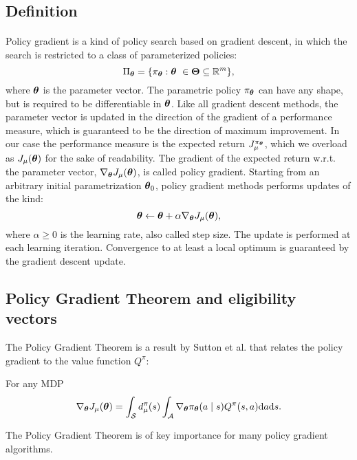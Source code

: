 \subsection{Definition}
\paragraph{} %
Policy gradient is a kind of policy search based on gradient descent, in which the search is restricted to a class of parameterized policies:  
\[
	\Pi_{\vtheta} = \{\pi_{\vtheta}:\vtheta\ \in \vTheta \subseteq \mathbb{R}^m\},
\]
where $\boldsymbol{\theta}$ is the parameter vector. The parametric policy $\pi_{\boldsymbol{\theta}}$ can have any shape, but is required to be differentiable in $\boldsymbol{\theta}$. Like all gradient descent methods, the parameter vector is updated in the direction of the gradient of a performance measure, which is guaranteed to be the direction of maximum improvement. In our case the performance measure is the expected return $J_{\mu}^{\pi_{\boldsymbol{\theta}}}$, which we overload as $J_{\mu}(\boldsymbol{\theta})$ for the sake of readability. The gradient of the expected return w.r.t. the parameter vector, $\nabla_{\boldsymbol{\theta}}J_\mu(\boldsymbol{\theta})$, is called policy gradient. Starting from an arbitrary initial parametrization $\boldsymbol{\theta}_0$, policy gradient methods performs updates of the kind: 
\[
	\boldsymbol{\theta} \gets \boldsymbol{\theta} + \alpha\nabla_{\boldsymbol{\theta}}J_\mu(\boldsymbol{\theta}),
\]
where $\alpha \geq 0$ is the learning rate, also called step size. The update is performed at each learning iteration.
Convergence to at least a local optimum is guaranteed by the gradient descent update.

\subsection{Policy Gradient Theorem and eligibility vectors}
The Policy Gradient Theorem is a result by Sutton et al. \cite{Sutton1999a} that relates the policy gradient to the value function $Q^\pi$:
\begin{theorem}\label{theo:pgt}
For any \ac{MDP}
\[
	\nabla_{\boldsymbol{\theta}}J_\mu(\boldsymbol{\theta}) = \int_{\mathcal{S}}d_{\mu}^{\pi}(s)
		\int_{\mathcal{A}} \nabla_{\boldsymbol{\theta}}\pi_{\boldsymbol{\theta}}(a \mid s)Q^{\pi}(s,a)\mathrm{d}a\mathrm{d}s.
\]
\end{theorem}
The Policy Gradient Theorem is of key importance for many policy gradient algorithms.


